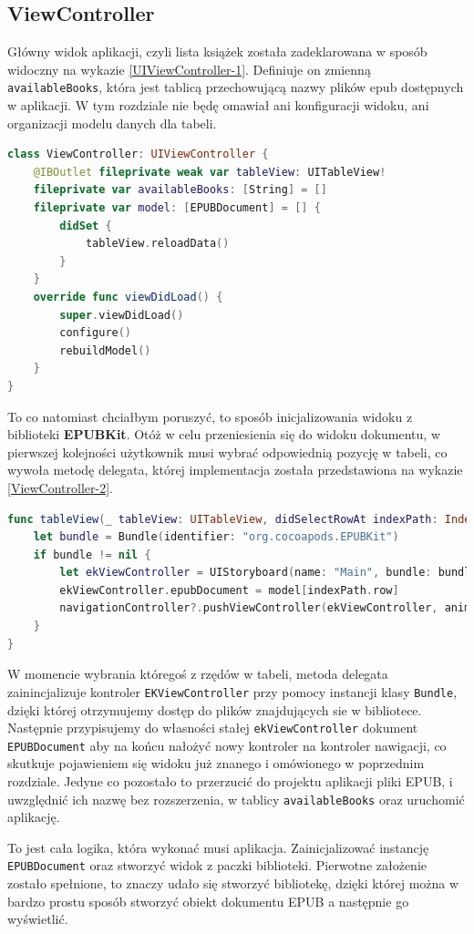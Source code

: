 \subsection*{ViewController}

Główny widok aplikacji, czyli lista książek została zadeklarowana w sposób widoczny na wykazie \ref{UIViewController-1}. Definiuje on zmienną \texttt{availableBooks}, która jest tablicą przechowującą nazwy plików epub dostępnych w aplikacji. W tym rozdziale nie będę omawiał ani konfiguracji widoku, ani organizacji modelu danych dla tabeli.

\begin{lstlisting}[caption={Deklaracja klasy \texttt{UIViewController}}, language=swift, label=ViewController-1]
class ViewController: UIViewController {
    @IBOutlet fileprivate weak var tableView: UITableView!
    fileprivate var availableBooks: [String] = []
    fileprivate var model: [EPUBDocument] = [] {
        didSet {
            tableView.reloadData()
        }
    }
    override func viewDidLoad() {
        super.viewDidLoad()
        configure()
        rebuildModel()
    }
}
\end{lstlisting}

To co natomiast chciałbym poruszyć, to sposób inicjalizowania widoku z biblioteki \textbf{EPUBKit}. Otóż w celu przeniesienia się do widoku dokumentu, w pierwszej kolejności użytkownik musi wybrać odpowiednią pozycję w tabeli, co wywoła metodę delegata, której implementacja została przedstawiona na wykazie \ref{ViewController-2}.

\begin{lstlisting}[caption={Deklaracja metody delegata \texttt{UITableView}}, language=swift, label=ViewController-2]
func tableView(_ tableView: UITableView, didSelectRowAt indexPath: IndexPath) {
    let bundle = Bundle(identifier: "org.cocoapods.EPUBKit")
    if bundle != nil {
        let ekViewController = UIStoryboard(name: "Main", bundle: bundle).instantiateViewController(withIdentifier: "EKViewController") as! EKViewController
        ekViewController.epubDocument = model[indexPath.row]
        navigationController?.pushViewController(ekViewController, animated: true)
    }
}
\end{lstlisting}

W momencie wybrania któregoś z rzędów w tabeli, metoda delegata zainincjalizuje kontroler \texttt{EKViewController} przy pomocy instancji klasy \texttt{Bundle}, dzięki której otrzymujemy dostęp do plików znajdujących sie w bibliotece. Następnie przypisujemy do własności stałej \texttt{ekViewController} dokument \texttt{EPUBDocument} aby na końcu nałożyć nowy kontroler na kontroler nawigacji, co skutkuje pojawieniem się widoku już znanego i omówionego w poprzednim rozdziale. Jedyne co pozostało to przerzucić do projektu aplikacji pliki EPUB, i uwzględnić ich nazwę bez rozszerzenia, w tablicy \texttt{availableBooks} oraz uruchomić aplikację.

To jest cała logika, która wykonać musi aplikacja. Zainicjalizować instancję \texttt{EPUBDocument} oraz stworzyć widok z paczki biblioteki. Pierwotne założenie zostało spełnione, to znaczy udało się stworzyć bibliotekę, dzięki której można w bardzo prostu sposób stworzyć obiekt dokumentu EPUB a następnie go wyświetlić.

